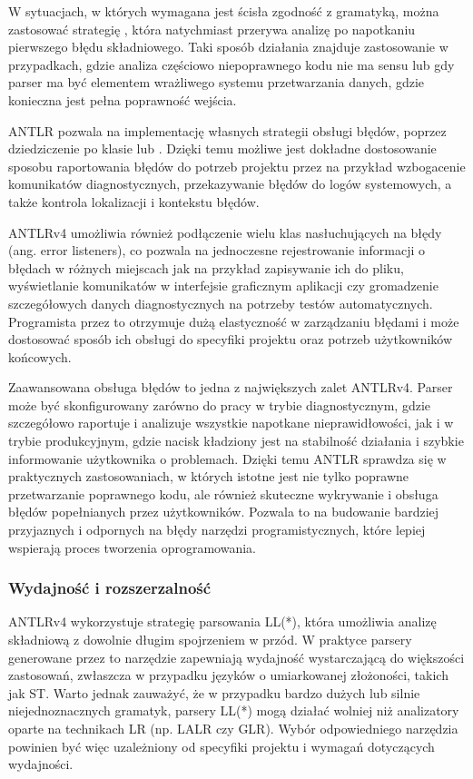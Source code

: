 \documentclass[12pt,twoside]{article}
\begin{document}
W sytuacjach, w których wymagana jest ścisła zgodność z gramatyką, można zastosować strategię , która natychmiast przerywa analizę po napotkaniu pierwszego błędu składniowego. Taki sposób działania znajduje zastosowanie w przypadkach, gdzie analiza częściowo niepoprawnego kodu nie ma sensu lub gdy parser ma być elementem wrażliwego systemu przetwarzania danych, gdzie konieczna jest pełna poprawność wejścia.

ANTLR pozwala na implementację własnych strategii obsługi błędów, poprzez dziedziczenie po klasie  lub . Dzięki temu możliwe jest dokładne dostosowanie sposobu raportowania błędów do potrzeb projektu przez na przykład wzbogacenie komunikatów diagnostycznych, przekazywanie błędów do logów systemowych, a także kontrola lokalizacji i kontekstu błędów. 

ANTLRv4 umożliwia również podłączenie wielu klas nasłuchujących na błędy (ang. error listeners), co pozwala na jednoczesne rejestrowanie informacji o błędach w różnych miejscach jak na przykład zapisywanie ich do pliku, wyświetlanie komunikatów w interfejsie graficznym aplikacji czy gromadzenie szczegółowych danych diagnostycznych na potrzeby testów automatycznych. Programista przez to otrzymuje dużą elastyczność w zarządzaniu błędami i może dostosować sposób ich obsługi do specyfiki projektu oraz potrzeb użytkowników końcowych.\cite{antlr4Book}

Zaawansowana obsługa błędów to jedna z największych zalet ANTLRv4. Parser może być skonfigurowany zarówno do pracy w trybie diagnostycznym, gdzie szczegółowo raportuje i analizuje wszystkie napotkane nieprawidłowości, jak i w trybie produkcyjnym, gdzie nacisk kładziony jest na stabilność działania i szybkie informowanie użytkownika o problemach. Dzięki temu ANTLR sprawdza się w praktycznych zastosowaniach, w których istotne jest nie tylko poprawne przetwarzanie poprawnego kodu, ale również skuteczne wykrywanie i obsługa błędów popełnianych przez użytkowników. Pozwala to na budowanie bardziej przyjaznych i odpornych na błędy narzędzi programistycznych, które lepiej wspierają proces tworzenia oprogramowania.
\subsubsection{Wydajność i rozszerzalność}
ANTLRv4 wykorzystuje strategię parsowania LL(*), która umożliwia analizę składniową z dowolnie długim spojrzeniem w przód. W praktyce parsery generowane przez to narzędzie zapewniają wydajność wystarczającą do większości zastosowań, zwłaszcza w przypadku języków o umiarkowanej złożoności, takich jak ST. Warto jednak zauważyć, że w przypadku bardzo dużych lub silnie niejednoznacznych gramatyk, parsery LL(*) mogą działać wolniej niż analizatory oparte na technikach LR (np. LALR czy GLR).\cite{antlr4Performance} Wybór odpowiedniego narzędzia powinien być więc uzależniony od specyfiki projektu i wymagań dotyczących wydajności.
\end{document}

